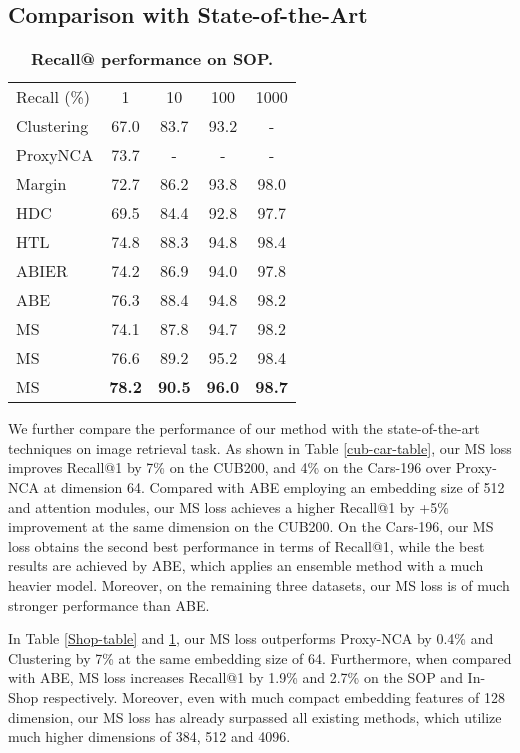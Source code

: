 \documentclass[10pt,twocolumn,letterpaper]{article}
\newcommand{\tablestyle}[2]{\setlength{\tabcolsep}{#1}\renewcommand{\arraystretch}{#2}\centering\footnotesize}
\begin{document}
\subsection{Comparison with State-of-the-Art}
\begin{table}[htp]
    \tablestyle{12pt}{1.1}
	\begin{center}
		\begin{tabular}{l|cccc}
			Recall (\%)& 1 & 10 & 100 & 1000\\ \shline
			{Clustering \cite{struct-clustering}}  & 67.0 & 83.7 & 93.2 & -\\
			{ProxyNCA} \cite{proxyloss} & 73.7 & -& -& -\\
			{Margin \cite{sampling}} & 72.7 & 86.2 & 93.8 & 98.0\\
			HDC \cite{struct-clustering}& 69.5 & 84.4 & 92.8 & 97.7 \\	
			HTL  \cite{HTL} & 74.8& 88.3& 94.8& 98.4\\\hline
			ABIER \cite{bier}  & 74.2 & 86.9 & 94.0 & 97.8 \\	
			ABE \cite{Kim_2018_ECCV} &76.3 & 88.4 & 94.8 & 98.2\\ 
			\hline
			{MS}   & 74.1& 87.8& 94.7& 98.2 \\
			{MS}   & 76.6& 89.2& 95.2& 98.4\\
			{MS}   & \bf  78.2& \bf  90.5& \bf  96.0& \bf  98.7 \\
\end{tabular}
		\vspace{4pt}
		\caption{\textbf{Recall@ performance on SOP.}}
		\label{sop-table}
		\vspace{-10pt}
	\end{center}
\end{table}

We further compare the performance of our method with the state-of-the-art techniques on image retrieval task.
As shown in Table \ref{cub-car-table}, our MS loss improves Recall@1 by 7\%  on the CUB200, and 4\% on the Cars-196 over Proxy-NCA at dimension 64.  Compared with ABE employing an embedding size of 512 and attention modules, our MS loss achieves a higher Recall@1 by +5\% improvement at the same dimension on the CUB200.
On the Cars-196, our MS loss obtains the second best performance in terms of Recall@1, while the best results are achieved by ABE, which applies an ensemble method with a much heavier model. Moreover, on the remaining three datasets, our MS loss is of much stronger performance than ABE. 

In Table \ref{Shop-table} and \ref{sop-table}, our MS loss outperforms Proxy-NCA by 0.4\% and Clustering by 7\% at the same embedding size of 64. Furthermore, when compared with ABE, MS loss increases Recall@1 by 1.9\%  and  2.7\% on the SOP and In-Shop respectively. Moreover, even with much compact embedding features of 128 dimension, our MS loss has already surpassed all existing methods, which utilize much higher dimensions of 384, 512 and 4096.
\end{document}
